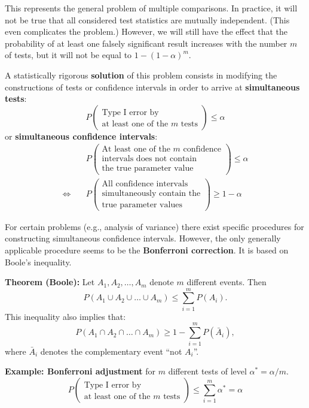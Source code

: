 \documentclass[]{book}
\theoremstyle{definition}
\theoremstyle{definition}
\theoremstyle{definition}
\theoremstyle{remark}
\begin{document}
This represents the general problem of multiple comparisons. In practice, it will not be true that all considered test statistics are mutually independent. (This even complicates the problem.) However, we will still have the effect that the probability of at least one falsely significant result increases with the number \(m\) of tests, but it will not be equal to \(1-(1-\alpha)^m\).

A statistically rigorous \textbf{solution} of this problem consists in modifying the constructions of tests or confidence intervals in order to arrive at \textbf{simultaneous tests}:
\[
P\begin{pmatrix}
    \text{Type I error by} \\
    \text{at least one of the $m$ tests}
 \end{pmatrix} \leq \alpha
\]
or \textbf{simultaneous confidence intervals}:
\begin{align*}
&P \begin{pmatrix}
      \text{At least one of the $m$ confidence} \\
      \text{intervals does not contain} \\
      \text{the true parameter value}
  \end{pmatrix}  \leq \alpha\\[2ex]
\Leftrightarrow\quad 
&P \begin{pmatrix}
    \text{All confidence intervals} \\
    \text{simultaneously contain the} \\
    \text{true parameter values}
  \end{pmatrix} \geq 1 - \alpha
\end{align*}

For certain problems (e.g., analysis of variance) there exist specific procedures for constructing
simultaneous confidence intervals. However, the only generally applicable procedure seems to be the
\textbf{Bonferroni correction}. It is based on Boole's inequality.

\textbf{Theorem (Boole):} Let \(A_1, A_2, \dots, A_m\) denote \(m\) different events. Then
\[
 P(A_1 \cup A_2 \cup \dots \cup A_m) \leq \sum_{i=1}^m P(A_i).
\]
This inequality also implies that:
\[
 P(A_1 \cap A_2 \cap \dots \cap A_m) \ge
  1 - \sum_{i=1}^m P(\bar A_i),
\]
where \(\bar A_i\) denotes the complementary event ``not \(A_i\)''.

\textbf{Example: Bonferroni adjustment} for \(m\) different tests of level \(\alpha^* = \alpha/m\).
\[
P\begin{pmatrix}
\text{Type I error by} \\
\text{at least one of the $m$ tests}
\end{pmatrix}
\leq \sum_{i=1}^m \alpha^\ast = \alpha
\]
\end{document}
